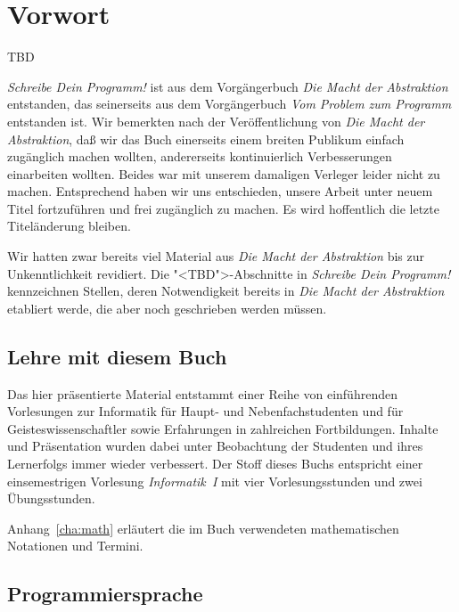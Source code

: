 
\chapter*{Vorwort}
\thispagestyle{empty}


TBD

\textit{Schreibe Dein Programm!} ist aus dem Vorgängerbuch \textit{Die
  Macht der Abstraktion} entstanden, das seinerseits aus dem
Vorgängerbuch \textit{Vom Problem zum Programm} entstanden ist.  Wir
bemerkten nach der Veröffentlichung von \textit{Die Macht der
  Abstraktion}, daß wir das Buch einerseits einem breiten Publikum
einfach zugänglich machen wollten, andererseits kontinuierlich
Verbesserungen einarbeiten wollten.  Beides war mit unserem damaligen
Verleger leider nicht zu machen.  Entsprechend haben wir uns
entschieden, unsere Arbeit unter neuem Titel fortzuführen und frei
zugänglich zu machen.  Es wird hoffentlich die letzte Titeländerung
bleiben.

Wir hatten zwar bereits viel Material aus \textit{Die Macht der
  Abstraktion} bis zur Unkenntlichkeit revidiert.  Die
"<TBD">-Abschnitte in \textit{Schreibe Dein Programm!} kennzeichnen
Stellen, deren Notwendigkeit bereits in \textit{Die Macht der
  Abstraktion} etabliert werde, die aber noch geschrieben werden
müssen.

\section*{Lehre mit diesem Buch}

Das hier präsentierte Material entstammt einer Reihe von einführenden
Vorlesungen zur Informatik für Haupt- und Nebenfachstudenten und für
Geisteswissenschaftler sowie Erfahrungen in zahlreichen Fortbildungen.
Inhalte und Präsentation wurden dabei unter
Beobachtung der Studenten und ihres Lern\-er\-folgs immer wieder
verbessert.  Der Stoff dieses Buchs entspricht einer einsemestrigen
Vorlesung \textit{Informatik~I} mit vier Vorlesungsstunden und zwei
Übungsstunden.

Anhang~\ref{cha:math} erläutert die im Buch verwendeten mathematischen
Notationen und Termini.

\section*{Programmiersprache}

